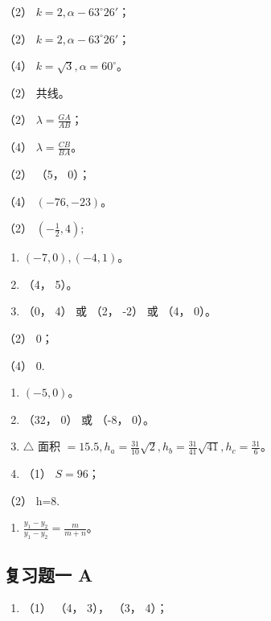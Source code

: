 （2） \(k = 2, \alpha - 63^{\circ}26'\)；

（2） \(k = 2, \alpha - 63^{\circ}26'\)；

（4） \(k = \sqrt{3}, \alpha = 60^{\circ}\)。

（2） 共线。

（2） \(\lambda = \frac{GA}{AB}\)；

（4） \(\lambda = \frac{CB}{BA}\)。

（2） （5， 0）；

（4） \((-76, -23)\)。

（2） \(\left(-\frac{1}{2},4\right);\)

\begin{enumerate}
\def\labelenumi{\arabic{enumi}.}
\setcounter{enumi}{5}
\item
  \((-7, 0), (-4, 1)\)。
\item
  （4， 5）。
\item
  （0， 4） 或 （2， -2） 或 （4， 0）。
\end{enumerate}

（2） 0；

（4） 0.

\begin{enumerate}
\def\labelenumi{\arabic{enumi}.}
\setcounter{enumi}{1}
\item
  \((-5,0)\)。
\item
  （32， 0） 或 （-8， 0）。
\item
  \(\triangle\) 面积
  \(= 15.5, h_{a} = \frac{31}{10}\sqrt{2}, h_{b} = \frac{31}{41}\sqrt{41}, h_{c} = \frac{31}{6}\)。
\item
  （1） \(S = 96\)；
\end{enumerate}

（2） h=8.

\begin{enumerate}
\def\labelenumi{\arabic{enumi}.}
\setcounter{enumi}{7}
\tightlist
\item
  \(\frac{y_1 - y_2}{y_1 - y_2} = \frac{m}{m + n}\)。
\end{enumerate}

\subsection{复习题一 A}\label{ux590dux4e60ux9898ux4e00-a-1}

\begin{enumerate}
\def\labelenumi{\arabic{enumi}.}
\tightlist
\item
  （1） （4， 3）， （3， 4）；
\end{enumerate}

